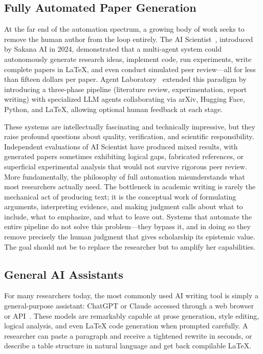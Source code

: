 \documentclass[a4paper,11pt]{article}
\begin{document}
\subsection{Fully Automated Paper Generation}

At the far end of the automation spectrum, a growing body of work seeks to remove the human author from the loop entirely. The AI Scientist~\cite{Lu2024AIScientist}, introduced by Sakana AI in 2024, demonstrated that a multi-agent system could autonomously generate research ideas, implement code, run experiments, write complete papers in LaTeX, and even conduct simulated peer review---all for less than fifteen dollars per paper. Agent Laboratory~\cite{Schmidgall2025AgentLab} extended this paradigm by introducing a three-phase pipeline (literature review, experimentation, report writing) with specialized LLM agents collaborating via arXiv, Hugging Face, Python, and LaTeX, allowing optional human feedback at each stage.

These systems are intellectually fascinating and technically impressive, but they raise profound questions about quality, verification, and scientific responsibility. Independent evaluations of AI Scientist have produced mixed results, with generated papers sometimes exhibiting logical gaps, fabricated references, or superficial experimental analysis that would not survive rigorous peer review. More fundamentally, the philosophy of full automation misunderstands what most researchers actually need. The bottleneck in academic writing is rarely the mechanical act of producing text; it is the conceptual work of formulating arguments, interpreting evidence, and making judgment calls about what to include, what to emphasize, and what to leave out. Systems that automate the entire pipeline do not solve this problem---they bypass it, and in doing so they remove precisely the human judgment that gives scholarship its epistemic value. The goal should not be to replace the researcher but to amplify her capabilities.

\subsection{General AI Assistants}

For many researchers today, the most commonly used AI writing tool is simply a general-purpose assistant: ChatGPT or Claude accessed through a web browser or API~\cite{ClaudeCode}. These models are remarkably capable at prose generation, style editing, logical analysis, and even LaTeX code generation when prompted carefully. A researcher can paste a paragraph and receive a tightened rewrite in seconds, or describe a table structure in natural language and get back compilable LaTeX.
\end{document}
